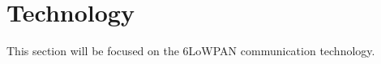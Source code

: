 \section{Technology}
\label{sec:technology}
This section will be focused on the 6LoWPAN communication technology. 
